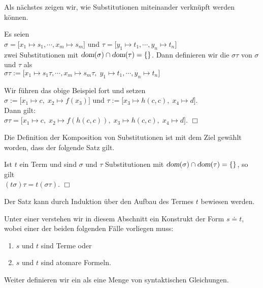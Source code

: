 \noindent
Als nächstes zeigen wir, wie  Substitutionen miteinander verknüpft werden können.
\begin{Definition} 
    Es seien\\[0.2cm]
    \hspace*{1.3cm}  $\sigma = \big[ x_1 \mapsto s_1, \cdots, x_m \mapsto s_m \big]$ \quad und \quad  $\tau = \big[ y_1 \mapsto t_1, \cdots, y_n \mapsto t_n \big]$ \\[0.2cm]
    zwei Substitutionen mit $\textsl{dom}(\sigma) \cap \textsl{dom}(\tau) = \{\}$. Dann definieren
    wir die  $\sigma\tau$ \index{$\sigma\tau$} von $\sigma$ und $\tau$ als \\[0.2cm]
    \hspace*{1.3cm} $\sigma\tau := \big[ x_1 \mapsto s_1\tau, \cdots, x_m \mapsto s_m\tau,\; y_1 \mapsto t_1, \cdots, y_n \mapsto t_n \big]$
    \eox
\end{Definition}

\example
Wir führen das obige Beispiel fort und setzen \\[0.2cm]
\hspace*{1.3cm} $\sigma := \big[ x_1 \mapsto c,\; x_2 \mapsto f(x_3) \big]$
                \quad und \quad $\tau := \big[ x_3 \mapsto h(c,c),\; x_4 \mapsto d \big]$. \\[0.2cm]
Dann gilt: \\[0.2cm]
\hspace*{1.3cm} $ \sigma\tau = \big[ x_1 \mapsto c,\; x_2 \mapsto f(h(c,c)),\; x_3 \mapsto h(c,c),\;x_4 \mapsto d \big]$.
\hspace*{\fill} $\Box$
\vspace{0.3cm}

\noindent
Die Definition der Komposition von Substitutionen ist mit dem Ziel gewählt worden, dass
der folgende Satz gilt.
\begin{Satz} \label{satz:komposition}
    Ist $t$ ein Term und sind $\sigma$ und $\tau$ Substitutionen mit 
    $\textsl{dom}(\sigma) \cap \textsl{dom}(\tau) = \{\}$, so gilt \\[0.2cm]
    \hspace*{1.3cm} $(t \sigma)\tau = t (\sigma\tau)$.
    \hspace*{\fill} $\Box$
\end{Satz}
Der Satz kann durch Induktion über den Aufbau des Termes $t$ bewiesen werden.


\begin{Definition} 
Unter einer  verstehen wir in diesem Abschnitt ein Konstrukt der Form
$s \doteq t$,  wobei einer der beiden folgenden Fälle vorliegen muss:
\begin{enumerate}
\item $s$ und $t$ sind Terme  oder
\item $s$ und $t$ sind atomare Formeln.
\end{enumerate}
Weiter definieren wir ein  als eine Menge
von syntaktischen Glei\-chun\-gen. 
\eox
\end{Definition}


